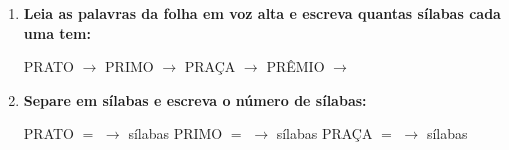 \begin{exercicio}
\begin{enumerate}[resume]
  \item \textbf{Leia as palavras da folha em voz alta e escreva quantas sílabas cada uma tem:}

  \begin{center}
  PRATO $\rightarrow$ \underline{\hspace{1cm}} \quad PRIMO $\rightarrow$ \underline{\hspace{1cm}} \quad PRAÇA $\rightarrow$ \underline{\hspace{1cm}} \quad PRÊMIO $\rightarrow$ \underline{\hspace{1cm}}
  \end{center}

  \item \textbf{Separe em sílabas e escreva o número de sílabas:}
  \begin{center}
  PRATO $=$ \underline{\hspace{1.2cm}} $\rightarrow$ \underline{\hspace{0.8cm}} sílabas \quad PRIMO $=$ \underline{\hspace{1.2cm}} $\rightarrow$ \underline{\hspace{0.8cm}} sílabas \quad PRAÇA $=$ \underline{\hspace{1.2cm}} $\rightarrow$ \underline{\hspace{0.8cm}} sílabas
  \end{center}

\end{enumerate}

\end{exercicio}



